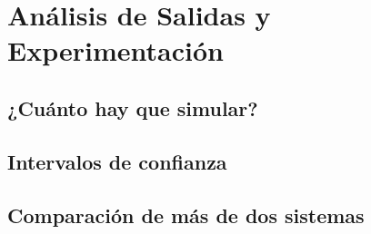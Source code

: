 \documentclass[11pt,a4paper]{report}
\begin{document}
\chapter{Análisis de Salidas y Experimentación}

\section{¿Cuánto hay que simular?}

\section{Intervalos de confianza}

\section{Comparación de más de dos sistemas}
\end{document}
